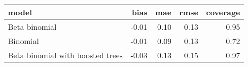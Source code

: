 \begin{table}[ht]
\centering
\begin{tabular}{lrrrr}
  \hline
model & bias & mae & rmse & coverage \\ 
  \hline
Beta binomial & -0.01 & 0.10 & 0.13 & 0.95 \\ 
  Binomial & -0.01 & 0.09 & 0.13 & 0.72 \\ 
  Beta binomial with boosted trees & -0.03 & 0.13 & 0.15 & 0.97 \\ 
   \hline
\end{tabular}
\end{table}
